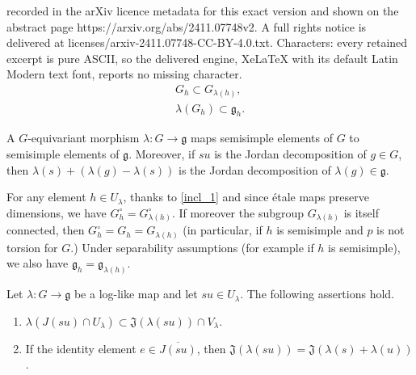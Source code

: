 \documentclass[10pt,a4paper]{amsart}
\newcommand{\J}{\mathfrak{J}}
\newcommand{\g}{\mathfrak{g}}
\begin{document}
recorded in the arXiv licence metadata for this exact version and shown on the abstract page https://arxiv.org/abs/2411.07748v2. A full rights notice is delivered at licenses/arxiv-2411.07748-CC-BY-4.0.txt. Characters: every retained excerpt is pure ASCII, so the delivered engine, XeLaTeX with its default Latin Modern text font, reports no missing character.
 \begin{align}
 G_h \subset G_{\lambda(h)}, \label{incl_1}\\
 \lambda(G_h) \subset \g_h. \label{incl_2}
 \end{align}

\begin{Lemma} \label{lem_ss}
A $G$-equivariant morphism $\lambda \colon G \to \g$ maps semisimple elements of $G$ to semisimple elements of $\g$.
Moreover, if $su$ is the Jordan decomposition of $g \in G$, then $\lambda(s) + (\lambda(g) - \lambda(s))$ is the Jordan decomposition of  $\lambda (g) \in \g$.
\end{Lemma}

\begin{Remark}\label{rk_etale}
For any element $h \in  U_\lambda$, thanks to  \eqref{incl_1} and since  \'etale maps preserve dimensions, we have $G_h^\circ = G_{\lambda(h)}^\circ$.
If moreover the subgroup $G_{\lambda(h)}$ is itself connected, then $G_h^\circ =G_h =   G_{\lambda(h)}$ (in particular, if $h$ is semisimple and $p$ is not torsion for $G$.)
Under separability assumptions (for example if $h$ is semisimple), we also have $\g_h = \g_{\lambda(h)}$.
\end{Remark}

\begin{Proposition} \label{prop_respect}
Let $\lambda \colon G \to \g$ be a log-like map and let $su \in U_\lambda$.
The following assertions hold.
\begin{enumerate}[label=(\arabic*)]
\item $\lambda( J(su) \cap U_\lambda) \subset \J(\lambda(su)) \cap V_\lambda$.
\item If the identity element $e \in \overline{J(su)}$, then $\J(\lambda(su)) = \J(\lambda(s) + \lambda(u))$.
\end{enumerate}
\end{Proposition}
\end{document}
